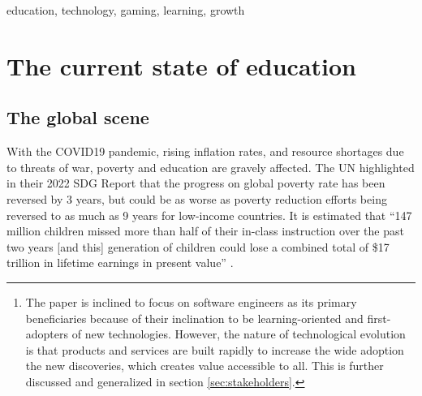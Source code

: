 \documentclass[conference]{IEEEtran}
\newcommand{\tomegg}{
  \href{http://tome.gg}{Tome.gg}
}
\begin{document}
\begin{abstract}
This whitepaper presents \tomegg's vision of hyper-personalized, inclusive, 
and equitable quality education and lifelong learning for all, starting with 
software engineers \footnote{The paper is inclined to focus on software engineers as its primary beneficiaries because of 
their inclination to be learning-oriented and  first-adopters of new technologies.
However, the nature of technological evolution is that products and services are 
built rapidly to increase the wide adoption the new discoveries, which creates value
accessible to all. This is further discussed and generalized in section \ref{sec:stakeholders}.}.

In section \ref{sec:state_of_education}, we discuss the state of education today, 
describe the educational challenges that software engineers face, and review the 
requirements and nature of personalized education.
In section \ref{sec:problems_challenges}, we formally define the problems and 
challenges that we aim to address.
In section \ref{sec:stakeholders}, we describe in more detail the different 
stakeholders, customers, and beneficiaries of the community.
In section \ref{sec:tomegg}, we introduce Tome.gg, its fundamental principles,
and the community that Tome.gg aims to serve.
In section \ref{sec:contribution}, we present applied theories and tooling built
on the Tome.gg platform that addresses the discussed challenges.

The remaining sections \ref{sec:principles_mindsets} and \ref{sec:community_directions}
expound on our community principles and directions that lay the groundwork for the 
active projects within the community. 

After reading this whitepaper, you will have a clear idea of who we are, what we
are trying to solve, and the spaces in our community that you can go: to lurk, 
participate, play, learn, teach, or create.
\end{abstract}

\begin{IEEEkeywords}
education, technology, gaming, learning, growth
\end{IEEEkeywords}

\section{The current state of education}
\label{sec:state_of_education}
\subsection{The global scene}
With the COVID19 pandemic, rising inflation rates, and resource shortages due to 
threats of war, poverty and education are gravely affected.
The UN highlighted in their 2022 SDG Report \cite{b1} that the progress on global poverty rate has been reversed by
3 years, but could be as worse as poverty reduction efforts being reversed to 
as much as 9 years for low-income countries\cite{b2}. It is estimated that 
``147 million children missed more than half of their in-class instruction over 
the past two years [and this] generation of children could lose a combined total of 
\$17 trillion in lifetime earnings in present value'' \cite{b3}.
\end{document}
